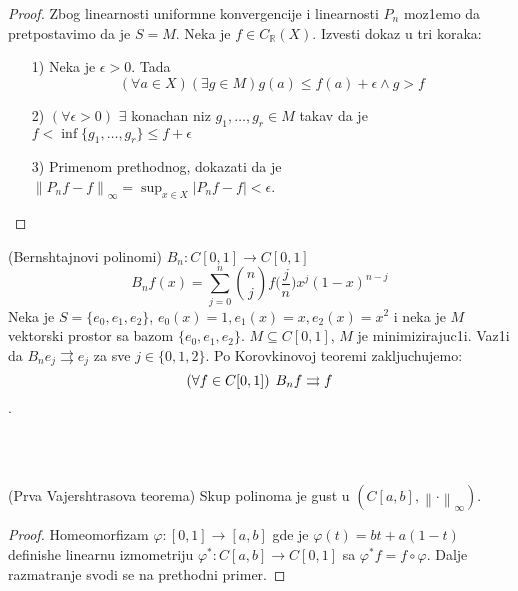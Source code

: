 \documentclass[a4paper,12pt]{article}
\newcommand{\RR}{\mathbb{R}}
\newcommand{\psj}{\subseteq}
\newcommand{\norm}[1]{\left\lVert#1\right\rVert}
\begin{document}
\begin{proof}
Zbog linearnosti uniformne konvergencije i linearnosti $P_n$ moz1emo da pretpostavimo da je $S = M$.  Neka je $f \in C_{\RR}(X)$. Izvesti dokaz u tri koraka:
\begin{itemize}
\item[1)] Neka je $\epsilon >0$. Tada 
\[(\forall a \in X)(\exists g \in M) g(a) \leq f(a) + \epsilon \wedge g > f\]
\item[2)] $(\forall \epsilon > 0)$ $\exists$ konachan niz $g_1, \dots, g_r \in M$ takav da je $f < \inf \{g_1, \dots, g_r \} \leq f + \epsilon $
\item[3)] Primenom prethodnog, dokazati da je $\norm{P_n f - f}_{\infty} = \sup_{x \in X} |P_nf - f|<\epsilon$.
\end{itemize}
\end{proof}

\begin{pr}
(Bernshtajnovi polinomi)
$B_n: C[0,1] \to C[0,1]$
\[B_n f(x) = \sum_{j=0}^n {{n}\choose{j}} f\bigg(\frac{j}{n}\bigg) x^j {(1-x)}^{n-j}\]
Neka je $S = \{e_0, e_1, e_2 \}$, $e_0(x) = 1, e_1(x) = x, e_2(x) = x^2$ i neka je $M$ vektorski prostor sa bazom $\{e_0,e_1,e_2\}$. $M \psj C[0,1]$, $M$ je minimizirajuc1i. Vaz1i da $B_n e_j \rightrightarrows e_j$ za sve $j \in \{0,1,2\}$. Po Korovkinovoj teoremi zakljuchujemo: \[(\forall f \in C[0,1])\hspace{0.15cm} B_n f \rightrightarrows f \].
\end{pr}
\\ \\
\begin{posl}
(Prva Vajershtrasova teorema) Skup polinoma je gust u $(C[a,b], \norm{\cdot}_{\infty})$.
\end{posl}
\begin{proof}
Homeomorfizam $\varphi:[0,1] \to [a,b]$ gde je $\varphi(t) = bt + a(1-t)$ definishe linearnu izmometriju $\varphi^*: C[a,b] \to C[0,1]$ sa $\varphi^* f = f \circ \varphi$. Dalje razmatranje svodi se na prethodni primer.
\end{proof}
\end{document}

